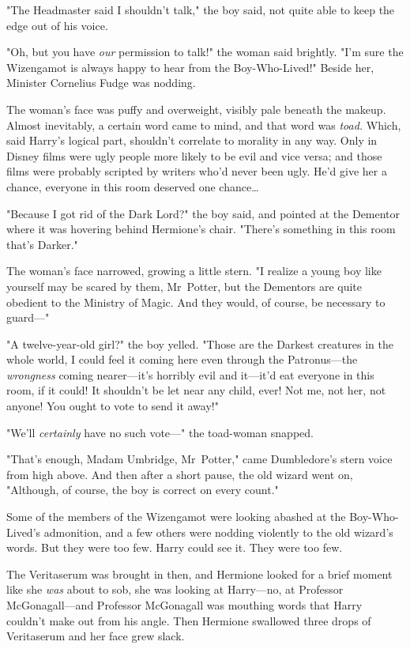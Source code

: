 "The Headmaster said I shouldn’t talk," the boy said, not quite able
to keep the edge out of his voice.

"Oh, but you have \emph{our} permission to talk!" the woman said brightly. "I’m
sure the Wizengamot is always happy to hear from the Boy-Who-Lived!" Beside
her, Minister Cornelius Fudge was nodding.

The woman’s face was puffy and overweight, visibly pale beneath the makeup.
Almost inevitably, a certain word came to mind, and that word was \emph{toad.}
Which, said Harry’s logical part, shouldn’t correlate to morality in any way.
Only in Disney films were ugly people more likely to be evil and vice versa;
and those films were probably scripted by writers who’d never been ugly. He’d
give her a chance, everyone in this room deserved one chance…

"Because I got rid of the Dark Lord?" the boy said, and pointed at the Dementor
where it was hovering behind Hermione’s chair. "There’s something in this room
that’s Darker."

The woman’s face narrowed, growing a little stern. "I realize a young boy like
yourself may be scared by them, Mr~Potter, but the Dementors are quite
obedient to the Ministry of Magic. And they would, of course, be necessary to
guard—"

"A twelve-year-old girl?" the boy yelled. "Those are the Darkest creatures in
the whole world, I could feel it coming here even through the Patronus—the
\emph{wrongness} coming nearer—it’s horribly evil and it—it’d eat everyone
in this room, if it could! It shouldn’t be let near any child, ever! Not me,
not her, not anyone! You ought to vote to send it away!"

"We’ll \emph{certainly} have no such vote—" the toad-woman snapped.

"That’s enough, Madam Umbridge, Mr~Potter," came Dumbledore’s stern voice from
high above. And then after a short pause, the old wizard went on, "Although, of
course, the boy is correct on every count."

Some of the members of the Wizengamot were looking abashed at the
Boy-Who-Lived’s admonition, and a few others were nodding violently to the old
wizard’s words. But they were too few. Harry could see it. They were too few.

The Veritaserum was brought in then, and Hermione looked for a brief moment
like she \emph{was} about to sob, she was looking at Harry—no, at Professor
McGonagall—and Professor McGonagall was mouthing words that Harry couldn’t
make out from his angle. Then Hermione swallowed three drops of Veritaserum and
her face grew slack.

